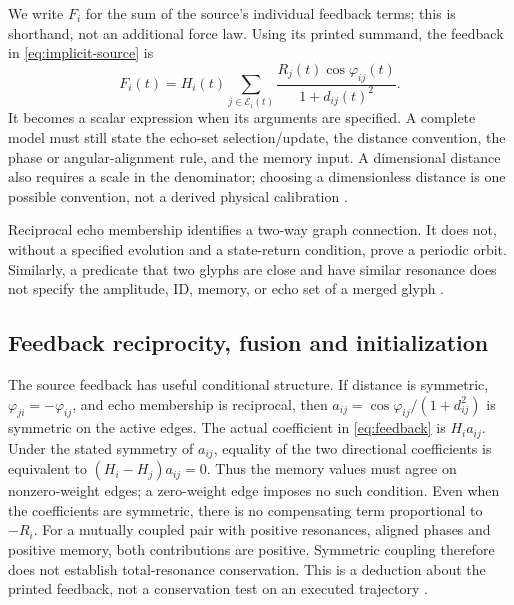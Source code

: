 \documentclass[11pt,a4paper]{article}
\theoremstyle{definition}
\numberwithin{equation}{section}
\begin{document}
We write $F_i$ for the sum of the source's individual feedback terms;
this is shorthand, not an additional force law. Using its printed summand,
the feedback in \eqref{eq:implicit-source} is
\begin{equation}
 F_i(t)=H_i(t)\sum_{j\in\mathcal E_i(t)}
 \frac{R_j(t)\cos\varphi_{ij}(t)}{1+d_{ij}(t)^2}.
 \label{eq:feedback}
\end{equation}
It becomes a scalar expression when its arguments are specified. A complete
model must still state the echo-set selection/update, the distance convention,
the phase or angular-alignment rule, and the memory input. A dimensional
distance also requires a scale in the denominator; choosing a dimensionless
distance is one possible convention, not a derived physical calibration
\cite[physical p.~7, \S3.2]{P03} \cite[\S2.2]{F01}.

Reciprocal echo membership identifies a two-way graph connection. It does not,
without a specified evolution and a state-return condition, prove a periodic
orbit. Similarly, a predicate that two glyphs are close and have similar
resonance does not specify the amplitude, ID, memory, or echo set of a merged
glyph \cite[physical pp.~3,10,12]{P03} \cite[\S\S2.3--2.4]{F01}.

\subsection{Feedback reciprocity, fusion and initialization}
\label{sec:feedback-domain}

The source feedback has useful conditional structure. If distance is
symmetric, $\varphi_{ji}=-\varphi_{ij}$, and echo membership is reciprocal,
then $a_{ij}=\cos\varphi_{ij}/(1+d_{ij}^2)$ is symmetric on the active edges.
The actual coefficient in \eqref{eq:feedback} is $H_i a_{ij}$. Under the
stated symmetry of $a_{ij}$, equality of the two directional coefficients is
equivalent to $(H_i-H_j)a_{ij}=0$. Thus the memory values must agree on
nonzero-weight edges; a zero-weight edge imposes no such condition.
Even when the coefficients are symmetric, there is no compensating term
proportional to $-R_i$. For a mutually coupled pair with positive resonances, aligned phases
and positive memory, both contributions are positive. Symmetric coupling
therefore does not establish total-resonance conservation.
This is a deduction about the printed feedback, not a conservation test on
an executed trajectory \cite[physical p.~7, \S3.2]{P03}.
\end{document}
